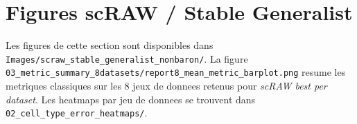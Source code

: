 \section*{Figures scRAW / Stable Generalist}

Les figures de cette section sont disponibles dans \texttt{Images/scraw_stable_generalist_nonbaron/}.
La figure \texttt{03_metric_summary_8datasets/report8_mean_metric_barplot.png} resume les metriques classiques sur les 8 jeux de donnees retenus pour \textit{scRAW best per dataset}.
Les heatmaps par jeu de donnees se trouvent dans \texttt{02_cell_type_error_heatmaps/}.

